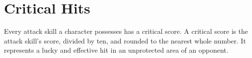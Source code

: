 








\section{Critical Hits}
Every attack skill a character possesses has a critical score. A critical score is the attack skill’s score, divided by ten, and rounded to the nearest whole number. It represents a lucky and effective hit in an unprotected area of an opponent.

